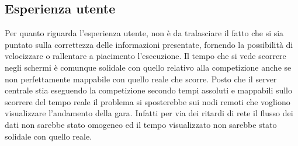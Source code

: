 \subsection{Esperienza utente}
Per quanto riguarda l’esperienza utente, non è da tralasciare il fatto che si sia puntato sulla correttezza delle informazioni presentate, fornendo la possibilità di velocizzare o rallentare a piacimento l’esecuzione. Il tempo che si vede scorrere negli schermi è comunque solidale con quello relativo alla competizione anche se non perfettamente mappabile con quello reale che scorre. Posto che il server centrale stia eseguendo la competizione secondo tempi assoluti e mappabili sullo scorrere del tempo reale il problema si sposterebbe sui nodi remoti che vogliono visualizzare l'andamento della gara. Infatti per via dei ritardi di rete il flusso dei dati non sarebbe stato omogeneo ed il tempo visualizzato non sarebbe stato solidale con quello reale.